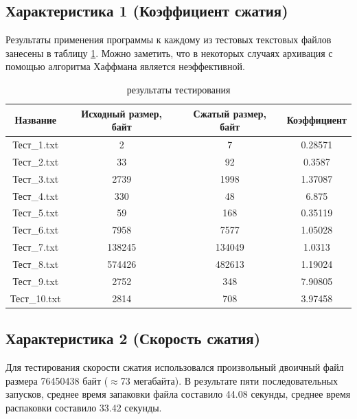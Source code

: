 \documentclass[a4paper,oneside]{article}
\theoremstyle{definition}
\begin{document}
\subsection{Характеристика 1 (Коэффициент сжатия)}

Результаты применения программы к каждому из тестовых текстовых файлов занесены
в таблицу \ref{tbl:results}. Можно заметить, что в некоторых случаях архивация с
помощью алгоритма Хаффмана является неэффективной.

\begin{table}[H]
    \small
    \centering
    \begin{tabular}{|c|c|c|c|}
        \hline
        Название     & Исходный размер, байт & Сжатый размер, байт & Коэффициент \\ \hline \hline
        Тест\_1.txt  & 2                     & 7                   & 0.28571     \\ \hline
        Тест\_2.txt  & 33                    & 92                  & 0.3587      \\ \hline
        Тест\_3.txt  & 2739                  & 1998                & 1.37087     \\ \hline
        Тест\_4.txt  & 330                   & 48                  & 6.875       \\ \hline
        Тест\_5.txt  & 59                    & 168                 & 0.35119     \\ \hline
        Тест\_6.txt  & 7958                  & 7577                & 1.05028     \\ \hline
        Тест\_7.txt  & 138245                & 134049              & 1.0313      \\ \hline
        Тест\_8.txt  & 574426                & 482613              & 1.19024     \\ \hline
        Тест\_9.txt  & 2752                  & 348                 & 7.90805     \\ \hline
        Тест\_10.txt & 2814                  & 708                 & 3.97458     \\ \hline
    \end{tabular}
    \caption{результаты тестирования}
    \label{tbl:results}
\end{table}

\subsection{Характеристика 2 (Скорость сжатия)}

Для тестирования скорости сжатия использовался произвольный двоичный файл
размера 76450438 байт ($\approx$73 мегабайта). В результате пяти последовательных
запусков, среднее время запаковки файла составило 44.08 секунды, среднее
время распаковки составило 33.42 секунды.
\end{document}
